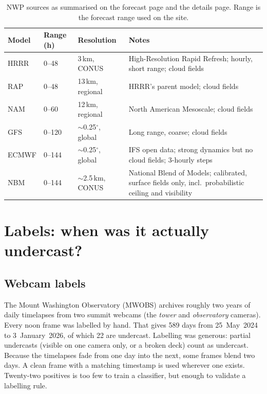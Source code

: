 \documentclass[11pt]{article}
\begin{document}
\begin{table}[ht]\centering\small
\caption{NWP sources as summarised on the forecast page and the details page. Range is the forecast
range used on the site.}\label{tab:nwp}
\begin{tabularx}{\linewidth}{l l l Y}
\toprule
Model & Range (h) & Resolution & Notes\\
\midrule
HRRR & 0--48 & 3\,km, CONUS & High-Resolution Rapid Refresh; hourly, short range; cloud fields\\
RAP  & 0--48 & 13\,km, regional & HRRR's parent model; cloud fields\\
NAM  & 0--60 & 12\,km, regional & North American Mesoscale; cloud fields\\
GFS  & 0--120 & $\sim$0.25$^\circ$, global & Long range, coarse; cloud fields\\
ECMWF & 0--144 & $\sim$0.25$^\circ$, global & IFS open data; strong dynamics but no cloud fields; 3-hourly steps\\
NBM  & 0--144 & $\sim$2.5\,km, CONUS & National Blend of Models; calibrated, surface fields only, incl.\ probabilistic ceiling and visibility\\
\bottomrule
\end{tabularx}
\end{table}

\section{Labels: when was it actually undercast?}\label{sec:labels}
\subsection{Webcam labels}
The Mount Washington Observatory (MWOBS) archives roughly two years of daily timelapses from two
summit webcams (the \emph{tower} and \emph{observatory} cameras). Every noon frame was labelled by
hand. That gives 589 days from 25~May~2024 to 3~January~2026, of which 22 are undercast. Labelling
was generous: partial undercasts (visible on one camera only, or a broken deck) count as undercast.
Because the timelapses fade from one day into the next, some frames blend two days. A clean frame
with a matching timestamp is used wherever one exists. Twenty-two positives is too few to train a
classifier, but enough to validate a labelling rule.
\end{document}
